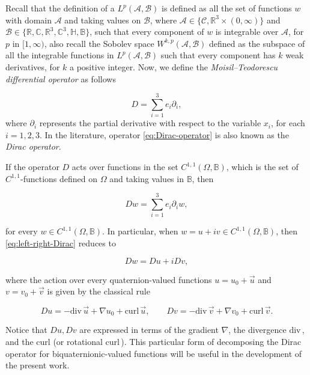 \documentclass[12pt]{article}
\def\A{\mathcal{A}}
\def\H{\mathbb{H}}
\def\R{\mathbb{R}}
\def\div{\mbox{div}\,}
\def\curl{\mbox{curl}\,}
\def\H{\mathbb{H}}
\def\B{\mathbb{B}}
\def\R{\mathbb{R}}
\begin{document}
Recall that the definition of a $L^p(\A, \mathcal{B} )$ is defined as all the set of functions $w$ with domain $\A$ and taking values on $\mathcal{B}$, where $\mathcal{A}\in \{\mathscr{C}, \R^3\times(0,\infty)\}$ and $\mathcal{B}\in \{\mathbb{R}, \mathbb{C},\mathbb{R}^3, \mathbb{C}^3,\H, \mathbb{B}\} $, such that every component of $w$ is integrable over $\A$, for $p$ in $[1,\infty)$, also recall the Sobolev space $W^{k,p}(\A, \mathcal{B})$ defined as the subspace of all the integrable functions in $L^p(\A,\mathcal{B})$ such that every component has $k$ weak derivatives, for $k$ a positive integer. Now, we define the \textit{Moisil--Teodorescu differential operator} as follows

\begin{equation}\label{eq:Dirac-operator}
	D=\sum_{i=1}^3e_i\partial_i,
\end{equation}
where $\partial_i$ represents the partial derivative with respect to the variable $x_i$, for each $i=1,2,3$. In the literature, operator \eqref{eq:Dirac-operator} is also known as the \textit{Dirac operator}.

If the operator $D$ acts over functions in the set $C^{1,1}(\Omega, \B)$, which is the set of $C^{1,1}$-functions defined on $\Omega$ and taking values in $\B$, then

\begin{equation}\label{eq:left-right-Dirac}
    Dw=\sum_{i=1}^3 e_i \partial_i w, 
\end{equation}

for every $w\in C^{1,1}(\Omega, \B)$. In particular, when $w=u+iv \in C^{1,1}(\Omega, \B)$, then \eqref{eq:left-right-Dirac} reduces to

\begin{equation}\label{eq:deco-div-curl}
    Dw=Du +iDv,
\end{equation}

where the action over every quaternion-valued functions $u=u_0+\vec{u}$ and $v=v_0+\vec{v}$ is given by the classical rule

\begin{equation}\label{eq:action-D}
   Du=-\div\vec{u}+\nabla u_0+\curl\vec{u}, \qquad Dv=-\div\vec{v}+\nabla v_0+\curl\vec{v}.
\end{equation}

Notice that $Du, Dv$ are expressed in terms of the gradient $\nabla$, the divergence $\div$, and the curl (or rotational $\curl$). This particular form of decomposing the Dirac operator for biquaternionic-valued functions will be useful in the development of the present work.
\end{document}
